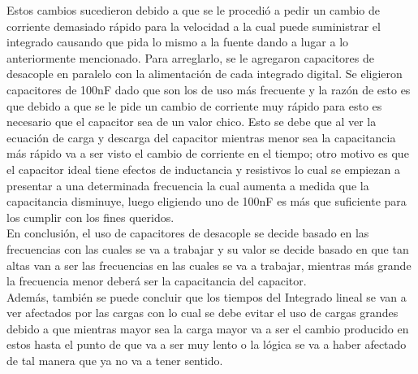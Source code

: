 Estos cambios sucedieron debido a que se le procedió a pedir un cambio de corriente demasiado rápido para la velocidad a la cual puede suministrar el integrado causando que pida lo mismo a la fuente dando a lugar a lo anteriormente mencionado. Para arreglarlo, se le agregaron capacitores de desacople en paralelo con la alimentación de cada integrado digital. Se eligieron capacitores de 100nF dado que son los de uso más frecuente y la razón de esto es que debido a que se le pide un cambio de corriente muy rápido para esto es necesario que el capacitor sea de un valor chico. Esto se debe que al ver la ecuación de carga y descarga del capacitor mientras menor sea la capacitancia más rápido va a ser visto el cambio de corriente en el tiempo; otro motivo es que el capacitor ideal tiene efectos de inductancia y resistivos lo cual se empiezan a presentar a una determinada frecuencia la cual aumenta a medida que la capacitancia disminuye, luego eligiendo uno de 100nF es más que suficiente para los cumplir con los fines queridos.\\
En conclusión, el uso de capacitores de desacople se decide basado en las frecuencias con las cuales se va a trabajar y su valor se decide basado en que tan altas van a ser las frecuencias en las cuales se va a trabajar, mientras más grande la frecuencia menor deberá ser la capacitancia del capacitor.\\
Además, también se puede concluir que los tiempos del Integrado lineal se van a ver afectados por las cargas con lo cual se debe evitar el uso de cargas grandes debido a que mientras mayor sea la carga mayor va a ser el cambio producido en estos hasta el punto de que va a ser muy lento o la lógica se va a haber afectado de tal manera que ya no va a tener sentido.\\
